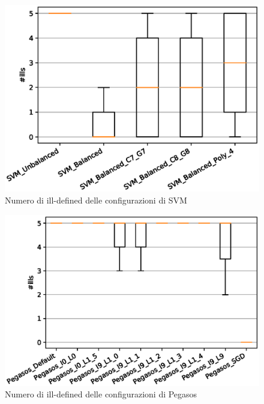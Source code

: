 \documentclass[12pt,a4paper,oneside,hidelinks]{report}
\begin{document}
\begin{figure}[hb]%
    \centering
    \includegraphics[scale = 0.80]{CC-SVM-ills.eps}%
    \caption{Numero di ill-defined delle configurazioni di SVM}%
    \label{figure:ill12}%
\end{figure}

\vspace*{\fill}

\vspace*{\fill}

\begin{figure}[ht]%
    \centering
    \includegraphics[scale = 0.80]{CC-Pegasos-ills.eps}%
    \caption{Numero di ill-defined delle configurazioni di Pegasos}%
    \label{figure:ill13}%
\end{figure}
\end{document}
